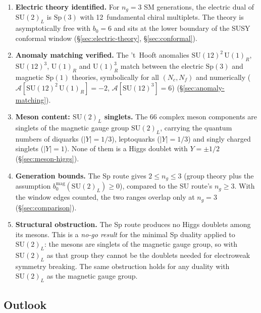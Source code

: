 \documentclass[11pt,a4paper]{article}
\theoremstyle{plain}
\theoremstyle{definition}
\theoremstyle{remark}
\newcommand{\Nc}{N_{\!c}}
\newcommand{\Nf}{N_{\!f}}
\newcommand{\SU}[1]{\mathrm{SU}(#1)}
\newcommand{\UU}[1]{\mathrm{U}(#1)}
\newcommand{\Sp}[1]{\mathrm{Sp}(#1)}
\begin{document}
\begin{enumerate}
  \item \textbf{Electric theory identified.}
    For $n_g = 3$ SM generations, the electric dual of $\SU{2}_L$ is
    $\Sp{3}$ with 12~fundamental chiral multiplets.  The theory is
    asymptotically free with $b_0 = 6$ and sits at the lower boundary
    of the SUSY conformal window (\S\ref{sec:electric-theory},
    \S\ref{sec:conformal}).

  \item \textbf{Anomaly matching verified.}
    The 't~Hooft anomalies $\SU{12}^2\,\UU{1}_R$, $\SU{12}^3$,
    $\UU{1}_R$ and $\UU{1}_R^3$ match between the electric $\Sp{3}$ and
    magnetic $\Sp{1}$ theories, symbolically for all $(\Nc, \Nf)$ and
    numerically ($\mathcal{A}[\SU{12}^2\,\UU{1}_R] = -2$,
    $\mathcal{A}[\SU{12}^3] = 6$) (\S\ref{sec:anomaly-matching}).

  \item \textbf{Meson content: $\SU{2}_L$ singlets.}
    The 66 complex meson components are singlets of the magnetic gauge
    group $\SU{2}_L$, carrying the quantum numbers of diquarks
    ($|Y| = 1/3$), leptoquarks ($|Y| = 1/3$) and singly charged
    singlets ($|Y| = 1$).  None of them is a Higgs doublet with
    $Y = \pm 1/2$ (\S\ref{sec:meson-higgs}).

  \item \textbf{Generation bounds.}
    The Sp route gives $2 \leq n_g \leq 3$ (group theory plus the
    assumption $b_0^{\mathrm{mag}}(\SU{2}_L) \geq 0$), compared to the
    SU route's $n_g \geq 3$.  With the window edges counted, the two
    ranges overlap only at $n_g = 3$ (\S\ref{sec:comparison}).

  \item \textbf{Structural obstruction.}
    The Sp route produces no Higgs doublets among its mesons.  This is
    a \emph{no-go result} for the minimal Sp duality applied to
    $\SU{2}_L$: the mesons are singlets of the magnetic gauge group, so
    with $\SU{2}_L$ as that group they cannot be the doublets needed for
    electroweak symmetry breaking.  The same obstruction holds for any
    duality with $\SU{2}_L$ as the magnetic gauge group.
\end{enumerate}

\subsection{Outlook}
\end{document}
